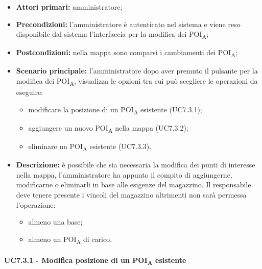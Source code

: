\begin{itemize}

\item   \textbf{Attori primari:} amministratore;

 \item   \textbf{Precondizioni:} l'amministratore è autenticato nel sistema e viene reso disponibile dal sistema l'interfaccia per la modifica dei POI\textsubscript{A};

 \item   \textbf{Postcondizioni:} nella mappa sono comparsi i cambiamenti dei POI\textsubscript{A}; 

\item   \textbf{Scenario principale:} l'amministratore dopo aver premuto il pulsante per la modifica dei POI\textsubscript{A}, visualizza le opzioni tra cui può scegliere le operazioni da eseguire:

  \begin{itemize}

    \item modificare la posizione di un POI\textsubscript{A} esistente (UC7.3.1);

    \item aggiungere un nuovo POI\textsubscript{A} nella mappa (UC7.3.2);

   \item eliminare un POI\textsubscript{A} esistente (UC7.3.3).

 \end{itemize}

\item   \textbf{Descrizione:} è possibile che sia necessaria la modifica dei punti di interesse nella mappa, l'amministratore ha appunto il compito di aggiungerne, modificarne o eliminarli in base alle esigenze del magazzino. Il responsabile deve tenere presente i vincoli del magazzino altrimenti non sarà permessa l'operazione:

  \begin{itemize}

\item almeno una base;

\item almeno un POI\textsubscript{A} di carico.

\end{itemize}

\end{itemize}



\paragraph{UC7.3.1 - Modifica posizione di un POI\textsubscript{A} esistente}



